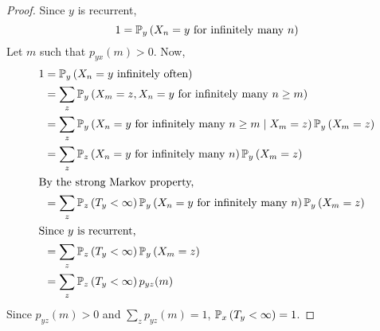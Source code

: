 \begin{proof}
	Since \( y \) is recurrent,
	\[
		1 = \mathbb{P}_{y}\left({X_n = y \text{ for infinitely many } n}\right)
	\]
	Let \( m \) such that \( p_{yx}(m) > 0 \).
	Now,
	\begin{align*}
		1 & = \mathbb{P}_{y}\left({X_n = y \text{ infinitely often}}\right)                                                       \\
		  & = \sum_z \mathbb{P}_{y}\left({X_m = z, X_n = y \text{ for infinitely many } n \geq m}\right)                          \\
		  & = \sum_z \mathbb{P}_{y}\left({X_n = y \text{ for infinitely many } n \geq m \mid X_m = z}\right) \mathbb{P}_{y}\left({X_m = z}\right)    \\
		  & = \sum_z \mathbb{P}_{z}\left({X_n = y \text{ for infinitely many } n}\right) \mathbb{P}_{y}\left({X_m = z}\right)                        \\
		\intertext{By the strong Markov property,}
		  & = \sum_z \mathbb{P}_{z}\left({T_y < \infty}\right) \mathbb{P}_{y}\left({X_n = y \text{ for infinitely many } n}\right) \mathbb{P}_{y}\left({X_m = z}\right) \\
		\intertext{Since \( y \) is recurrent,}
		  & = \sum_z \mathbb{P}_{z}\left({T_y < \infty}\right) \mathbb{P}_{y}\left({X_m = z}\right)                                                  \\
		  & = \sum_z \mathbb{P}_{z}\left({T_y < \infty}\right) p_{yz}(m)
	\end{align*}
	Since \( p_{yz}(m) > 0 \) and \( \sum_z p_{yz}(m) = 1 \), \( \mathbb{P}_{x}\left({T_y < \infty}\right) = 1 \).
\end{proof}